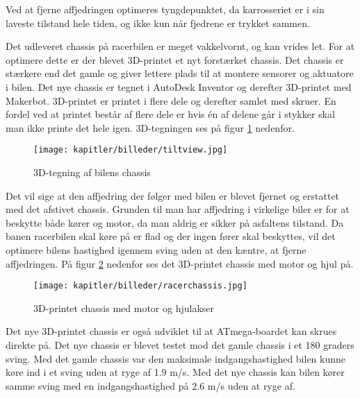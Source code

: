 Ved at fjerne affjedringen optimeres tyngdepunktet, da karrosseriet er i sin laveste tilstand hele tiden, og ikke kun når fjedrene er trykket sammen.

Det udleveret chassis på racerbilen er meget vakkelvornt, og kan vrides let.
For at optimere dette er der blevet 3D-printet et nyt forstærket chassis.
Det chassis er stærkere end det gamle og giver lettere plads til at montere sensorer og aktuatore i bilen.
Det nye chassis er tegnet i AutoDesk Inventor og derefter 3D-printet med Makerbot.
3D-printet er printet i flere dele og derefter samlet med skruer.
En fordel ved at printet består af flere dele er hvis én af delene går i stykker skal man ikke printe det hele igen.
3D-tegningen ses på figur \ref{fig:3Dtegning} nedenfor.

\begin{figure}[ht]
    \centering
    \texttt{[image: kapitler/billeder/tiltview.jpg]}
    \caption{3D-tegning af bilens chassis}
    \label{fig:3Dtegning}
\end{figure}


Det vil sige at den affjedring der følger med bilen er blevet fjernet og erstattet med det afstivet chassis. Grunden til man har affjedring i virkelige biler er for at beskytte både kører og motor, da man aldrig er sikker på asfaltens tilstand.
Da banen racerbilen skal køre på er flad og der ingen fører skal beskyttes, vil det optimere bilens hastighed igennem sving uden at den kæntre, at fjerne affjedringen. På figur \ref{fig:racerchassis} nedenfor ses det 3D-printet chassis med motor og hjul på.

\begin{figure}[ht]
    \centering
    \texttt{[image: kapitler/billeder/racerchassis.jpg]}
    \caption{3D-printet chassis med motor og hjulakser}
    \label{fig:racerchassis}
\end{figure}

Det nye 3D-printet chassis er også udviklet til at ATmega-boardet kan skrues direkte på. Det nye chassis er blevet testet mod det gamle chassis i et 180 graders sving. Med det gamle chassis var den maksimale indgangshastighed bilen kunne køre ind i et sving uden at ryge af 1.9 m/s. Med det nye chassis kan bilen kører samme sving med en indgangshastighed på 2.6 m/s uden at ryge af.
